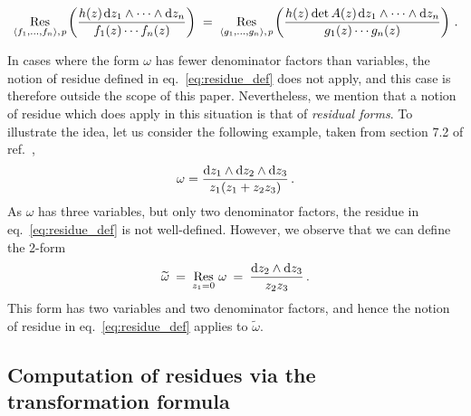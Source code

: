 \documentclass[dvipsnames,preprint,12pt,sort&compress]{elsarticle}
\def\d{{\rm d}}
\begin{document}
\begin{equation}
\mathop{\mathrm{Res}}_{\langle f_1, \ldots, f_n \rangle, \hspace{0.3mm} p} \hspace{-0.2mm}\left(
\frac{h(z) \hspace{0.4mm} \d z_1 \wedge \cdots \wedge \d z_n}{f_1 (z) \cdots f_n (z)} \right)
\hspace{1mm}=\hspace{1mm} \mathop{\mathrm{Res}}_{\langle g_1, \ldots, g_n \rangle, \hspace{0.3mm} p}
 \hspace{-0.2mm}\left(
\frac{h(z) \hspace{0.1mm} \det A(z) \hspace{0.4mm} \d z_1 \wedge \cdots \wedge \d z_n}
{g_1 (z) \cdots g_n (z)} \right) \,. \label{eq:transformation_law}
\end{equation}

In cases where the form $\omega$ has fewer denominator factors than variables,
the notion of residue defined in eq.~\eqref{eq:residue_def} does not apply,
and this case is therefore outside the scope of this paper. Nevertheless,
we mention that a notion of residue which does apply in this situation is
that of \emph{residual forms}. To illustrate the idea, let us consider
the following example, taken from section 7.2 of ref.~\cite{ArkaniHamed:2009dn},
\begin{equation}
\omega = \frac{\d z_1 \wedge \d z_2 \wedge \d z_3}{z_1 (z_1 + z_2 z_3)} \,.
\end{equation}
As $\omega$ has three variables, but only two denominator factors, the
residue in eq.~\eqref{eq:residue_def} is not well-defined. However, we observe
that we can define the 2-form
\begin{equation}
\widetilde{\omega} \hspace{0.8mm}=\hspace{0.8mm} \mathop{\mathrm{Res}}_{z_1=0} \hspace{0.4mm} \omega
\hspace{0.8mm}=\hspace{0.8mm} \frac{\d z_2 \wedge \d z_3}{z_2 z_3} \,.
\end{equation}
This form has two variables and two denominator factors, and hence the notion
of residue in eq.~\eqref{eq:residue_def} applies to $\widetilde{\omega}$.


\subsection{Computation of residues via the transformation formula}%
\label{sec:residues_from_transformation_formula}
\end{document}
